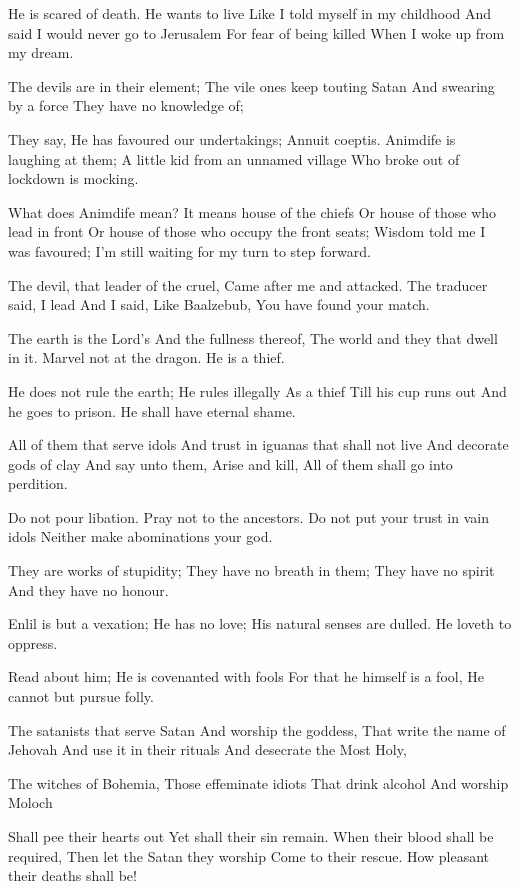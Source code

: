 \documentclass[
]{book}
\begin{document}
He is scared of death.
He wants to live
Like I told myself in my childhood
And said I would never go to Jerusalem
For fear of being killed
When I woke up from my dream.

The devils are in their element;
The vile ones keep touting Satan
And swearing by a force
They have no knowledge of;

They say, He has favoured our undertakings;
Annuit coeptis.
Animdife is laughing at them;
A little kid from an unnamed village
Who broke out of lockdown is mocking.

What does Animdife mean?
It means house of the chiefs
Or house of those who lead in front
Or house of those who occupy the front seats;
Wisdom told me I was favoured;
I'm still waiting for my turn to step forward.

The devil, that leader of the cruel,
Came after me and attacked.
The traducer said, I lead
And I said, Like Baalzebub,
You have found your match.

The earth is the Lord's
And the fullness thereof,
The world and they that dwell in it.
Marvel not at the dragon.
He is a thief.

He does not rule the earth;
He rules illegally
As a thief
Till his cup runs out
And he goes to prison.
He shall have eternal shame.

All of them that serve idols
And trust in iguanas that shall not live
And decorate gods of clay
And say unto them, Arise and kill,
All of them shall go into perdition.

Do not pour libation.
Pray not to the ancestors.
Do not put your trust in vain idols
Neither make abominations your god.

They are works of stupidity;
They have no breath in them;
They have no spirit
And they have no honour.

Enlil is but a vexation;
He has no love;
His natural senses are dulled.
He loveth to oppress.

Read about him;
He is covenanted with fools
For that he himself is a fool,
He cannot but pursue folly.

The satanists that serve Satan
And worship the goddess,
That write the name of Jehovah
And use it in their rituals
And desecrate the Most Holy,

The witches of Bohemia,
Those effeminate idiots
That drink alcohol
And worship Moloch

Shall pee their hearts out
Yet shall their sin remain.
When their blood shall be required,
Then let the Satan they worship
Come to their rescue.
How pleasant their deaths shall be!
\end{document}
